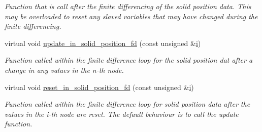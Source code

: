 \begin{DoxyCompactItemize}
\begin{DoxyCompactList}\small\item\em Function that is call after the finite differencing of the solid position data. This may be overloaded to reset any slaved variables that may have changed during the finite differencing. \end{DoxyCompactList}\item 
virtual void \hyperlink{classoomph_1_1SolidFiniteElement_a84d5c177b27570c35dd7693b913c00a5}{update\+\_\+in\+\_\+solid\+\_\+position\+\_\+fd} (const unsigned \&\hyperlink{cfortran_8h_adb50e893b86b3e55e751a42eab3cba82}{i})
\begin{DoxyCompactList}\small\item\em Function called within the finite difference loop for the solid position dat after a change in any values in the n-\/th node. \end{DoxyCompactList}\item 
virtual void \hyperlink{classoomph_1_1SolidFiniteElement_a99e4613b1ac5f202c837c0e556f7b917}{reset\+\_\+in\+\_\+solid\+\_\+position\+\_\+fd} (const unsigned \&\hyperlink{cfortran_8h_adb50e893b86b3e55e751a42eab3cba82}{i})
\begin{DoxyCompactList}\small\item\em Function called within the finite difference loop for solid position data after the values in the i-\/th node are reset. The default behaviour is to call the update function. \end{DoxyCompactList}\end{DoxyCompactItemize}
